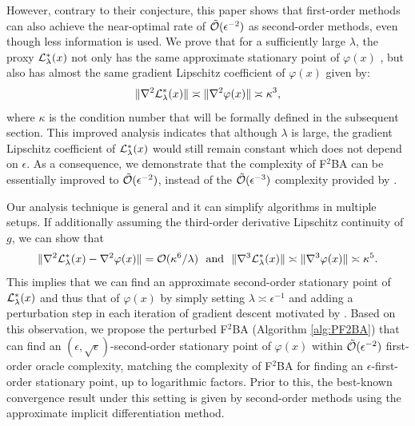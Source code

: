\documentclass{article}
\begin{document}
However, contrary to their conjecture, this paper shows that first-order methods can also achieve the near-optimal rate of $\tilde {{\mathcal{O}}}(\epsilon^{-2})$ as second-order methods, even though less information is used.
We prove that for a sufficiently large $\lambda$, the proxy ${\mathcal{L}}_{\lambda}^*(x)$ not only has the same approximate stationary point of $\varphi(x)$ , but also has almost the same gradient Lipschitz coefficient of $\varphi(x)$ given by:
\begin{align*}
    \Vert \nabla^2 {\mathcal{L}}_{\lambda}^*(x) \Vert \asymp \Vert \nabla^2 \varphi(x) \Vert \asymp \kappa^3,
\end{align*}
where $\kappa$ is the condition number that will be formally defined in the subsequent section. This improved analysis indicates that although $\lambda$ is large, the gradient Lipschitz coefficient of ${\mathcal{L}}_{\lambda}^*(x)$ would still remain constant which does not depend on $\epsilon$. As a consequence, we demonstrate that the complexity of F${}^2$BA can be essentially improved to $\tilde {{\mathcal{O}}}(\epsilon^{-2})$, instead of the $\tilde {{\mathcal{O}}}(\epsilon^{-3})$ complexity provided by \citet{kwon2023fully}.

Our analysis technique is general and it can simplify algorithms in multiple setups.
If additionally assuming the third-order derivative Lipschitz continuity of $g$, we can show that
\begin{align*}
    \Vert \nabla^2 {\mathcal{L}}_{\lambda}^*(x) - \nabla^2 \varphi(x) \Vert = {\mathcal{O}}(\kappa^6 /\lambda) ~~{\rm and}~~  \Vert \nabla^3 {\mathcal{L}}_{\lambda}^*(x) \Vert \asymp \Vert \nabla^3 \varphi(x) \Vert \asymp \kappa^5.
\end{align*}
This implies that we can find an approximate second-order stationary point of ${\mathcal{L}}_{\lambda}^*(x)$ and thus that of $\varphi(x)$ by simply setting $\lambda \asymp \epsilon^{-1}$ and adding a perturbation step in each iteration of gradient descent motivated by 
\citet{jin2017escape}. Based on this observation, we propose the perturbed F${}^2$BA (Algorithm \ref{alg:PF2BA}) that can find an $(\epsilon,\sqrt{\epsilon})$-second-order stationary point of $\varphi(x)$ within $\tilde {{\mathcal{O}}}(\epsilon^{-2})$ first-order oracle complexity, matching the complexity of F${}^2$BA for finding an $\epsilon$-first-order stationary point, up to logarithmic factors.
Prior to this, the best-known convergence result under this setting is given by second-order methods \cite{huang2022efficiently} using the approximate implicit differentiation method.
\end{document}
